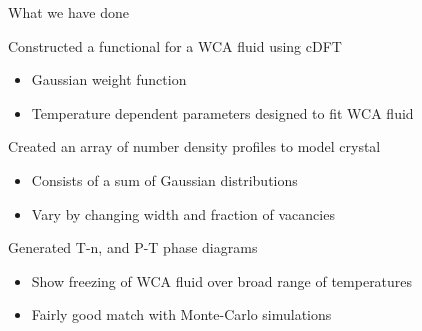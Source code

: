 \documentclass{beamer}
\begin{document}
\begin{frame}{What we have done}
        \begin{block}{Constructed a functional for a WCA fluid using cDFT}
            \begin{itemize}
              \item Gaussian weight function  
              \item Temperature dependent parameters designed to fit WCA fluid
           \end{itemize}
        \end{block}
        \begin{block}{Created an array of number density profiles to model crystal}
           \begin{itemize}
              \item Consists of a sum of Gaussian distributions %
              \item Vary by changing width and fraction of vacancies
           \end{itemize}
         \end{block}
         \begin{block}{Generated T-n, and P-T phase diagrams}
           \begin{itemize}
              \item Show freezing of WCA fluid over broad range of temperatures
              \item Fairly good match with Monte-Carlo simulations
           \end{itemize}
         \end{block}
\end{frame}
\end{document}
